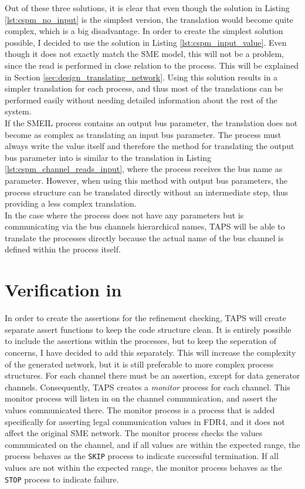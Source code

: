 Out of these three solutions, it is clear that even though the solution in Listing \ref{lst:cspm_no_input} is the simplest version, the translation would become quite complex, which is a big disadvantage. In order to create the simplest solution possible, I decided to use the solution in Listing \ref{lst:cspm_input_value}. Even though it does not exactly match the SME model, this will not be a problem, since the read is performed in close relation to the process. This will be explained in Section \ref{sec:design_translating_network}. Using this solution results in a simpler translation for each process, and thus most of the translations can be performed easily without needing detailed information about the rest of the system.\\

If the SMEIL process contains an output bus parameter, the translation does not become as complex as translating an input bus parameter. The process must always write the value itself and therefore the method for translating the output bus parameter into \cspm{} is similar to the translation in Listing \ref{lst:cspm_channel_reads_input}, where the process receives the bus name as parameter. However, when using this method with output bus parameters, the process structure can be translated directly without an intermediate step, thus providing a less complex translation.\\

In the case where the process does not have any parameters but is communicating via the bus channels hierarchical names, TAPS will be able to translate the processes directly because the actual name of the bus channel is defined within the process itself.

\section{Verification in \cspm{}}
In order to create the assertions for the refinement checking, TAPS will create separate assert functions to keep the code structure clean. It is entirely possible to include the assertions within the processes, but to keep the seperation of concerns, I have decided to add this separately. This will increase the complexity of the generated \cspm{} network, but it is still preferable to more complex process structures. For each \cspm{} channel there must be an assertion, except for data generator channels. Consequently, TAPS creates a \textit{monitor} process for each channel. This monitor process will listen in on the channel communication, and assert the values communicated there. The monitor process is a process that is added specifically for asserting legal communication values in FDR4, and it does not affect the original SME network. The monitor process checks the values communicated on the channel, and if all values are within the expected range, the process behaves as the \texttt{SKIP} process to indicate successful termination. If all values are not within the expected range, the monitor process behaves as the \texttt{STOP} process to indicate failure. \\

